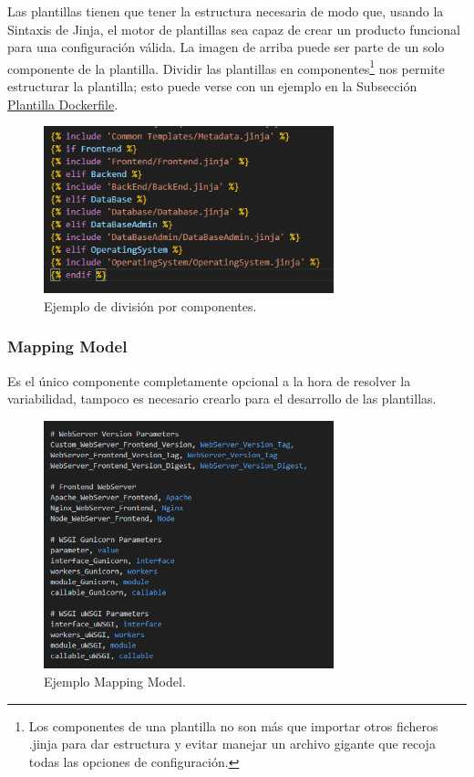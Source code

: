\documentclass[12pt, a4paper, twoside]{article}
\begin{document}
Las plantillas tienen que tener la estructura necesaria de modo que, usando la Sintaxis de Jinja, el motor de plantillas sea capaz de crear un producto funcional para una configuración válida. La imagen de arriba puede ser parte de un solo componente de la plantilla.
Dividir las plantillas en componentes\footnote{Los componentes de una plantilla no son más que importar otros ficheros .jinja para dar estructura y evitar manejar un archivo gigante que recoja todas las opciones de configuración.} nos permite estructurar la plantilla; esto puede verse con un ejemplo en la Subsección \hyperref[sec:Plantilla Dockerfile]{Plantilla Dockerfile}.

\begin{figure}[h]
	\centering
		\includegraphics[width=0.75\textwidth]{Dockerfile.logica.plantillas.jinja.png}
	\caption{Ejemplo de división por componentes.}
\end{figure}


\newpage
\subsubsection{Mapping Model}
\label{sec:Mapping Model}
Es el único componente completamente opcional a la hora de resolver la variabilidad, tampoco es necesario crearlo para el desarrollo de las plantillas.

\begin{figure}[h]
	\centering
		\includegraphics[width=0.75\textwidth]{mapping_model_screenshot.png}
	\caption{Ejemplo Mapping Model.}
\end{figure}
\end{document}
